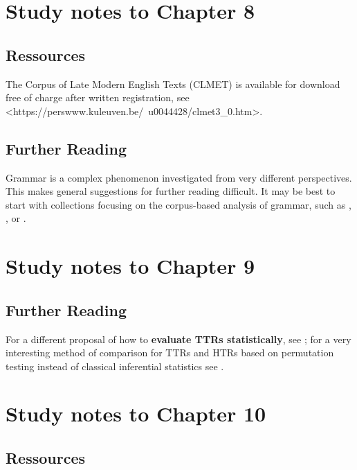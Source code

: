 \section{Study notes to Chapter 8}
\label{sec:studynotes08}

\subsection{Ressources}
\label{sec:ressources08}

The Corpus of Late Modern English Texts (CLMET) is available for download free of charge after written registration, see <https://perswww.kuleuven.be/~u0044428/clmet3\_0.htm>.

\subsection{Further Reading}
\label{sec:furtherreading08}

Grammar is a complex phenomenon investigated from very different perspectives. This makes general suggestions for further reading difficult. It may be best to start with collections focusing on the corpus-based analysis of grammar, such as \citet{rohdenburg_determinants_2003}, \citet{gries_corpora_2006}, \citet{rohdenburg_one_2009} or \citet{lindquist_corpus_2004}.

\section{Study notes to Chapter 9}
\label{sec:studynotes09}

\subsection{Further Reading}
\label{sec:furtherreading09}

For a different proposal of how to \textbf{evaluate TTRs statistically}, see \citet[Section 6.5]{baayen_analyzing_2008}; for a very interesting method of comparison for TTRs and HTRs based on permutation testing instead of classical inferential statistics see \citet{saily_comparing_2009}.

\section{Study notes to Chapter 10}
\label{sec:studynotes10}

\subsection{Ressources}
\label{sec:ressources10}

